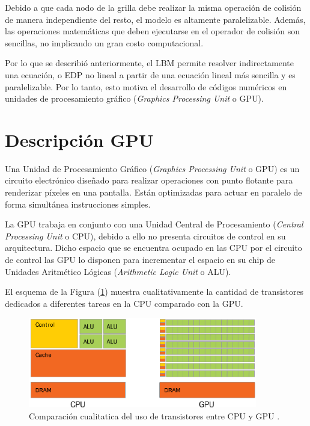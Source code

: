 Debido a que cada nodo de la grilla debe realizar la misma operación de colisión de manera independiente del resto, el modelo es altamente paralelizable. Además, las operaciones matemáticas que deben ejecutarse en el operador de colisión son sencillas, no implicando un gran costo computacional.

Por lo que se describió anteriormente, el LBM permite resolver indirectamente una ecuación, o EDP no lineal a partir de una ecuación lineal más sencilla y es paralelizable. Por lo tanto, esto motiva el desarrollo de códigos numéricos en unidades de procesamiento gráfico (\textit{Graphics Processing Unit} o GPU).
\newpage
\section{Descripción GPU}

Una Unidad de Procesamiento Gráfico (\textit{Graphics Processing Unit} o GPU) es un  circuito electrónico diseñado para realizar operaciones con punto flotante para renderizar píxeles en una pantalla. Están optimizadas para actuar en paralelo de forma simultánea instrucciones simples.

La GPU trabaja en conjunto con una Unidad Central de Procesamiento (\textit{Central Processing Unit} o CPU), debido a ello no presenta circuitos de control en su arquitectura. Dicho espacio que se encuentra ocupado en las CPU por el circuito de control las GPU lo disponen para incrementar el espacio en su chip de Unidades Aritmético Lógicas (\textit{Arithmetic Logic Unit} o ALU).

El esquema de la Figura (\ref{fig:cpu_gpu_transis}) muestra cualitativamente la cantidad de transistores dedicados a diferentes tareas en la CPU comparado con la GPU.

\begin{figure}[h!]
	\centering
	\includegraphics[width=10cm]{cpu_gpu.png}
	\caption{Comparación cualitatica del uso de transistores entre CPU y GPU \cite{rinaldi2011modelos}.}
	\label{fig:cpu_gpu_transis}
\end{figure}

